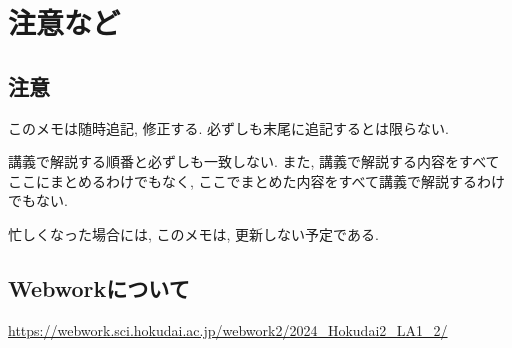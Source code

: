 \chapter{注意など}
\section{注意}
このメモは随時追記, 修正する.
必ずしも末尾に追記するとは限らない.

講義で解説する順番と必ずしも一致しない.
また, 講義で解説する内容をすべてここにまとめるわけでもなく,
ここでまとめた内容をすべて講義で解説するわけでもない.

忙しくなった場合には,
このメモは,
更新しない予定である.


\section{Webworkについて}
\url{https://webwork.sci.hokudai.ac.jp/webwork2/2024_Hokudai2_LA1_2/}
